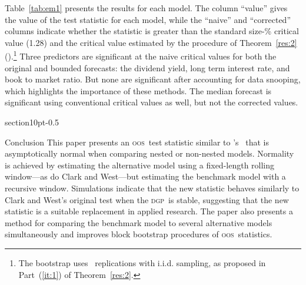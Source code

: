 \documentclass[11pt,fleqn]{article}
\makeatletter
\newcommand\poscw{\citeauthor{ClW:06}'s \citeyearpar{ClW:06,ClW:07}}
\renewcommand\section{\@startsection%
{section}{1}{0pt}{-\baselineskip}{0.5\baselineskip}%
{\normalfont\normalsize\bfseries\large\raggedright}}
\theoremstyle{definition}
\newcommand{\dgp}{\textsc{dgp}}
\newcommand{\oos}{\textsc{oos}}
\makeatother
\begin{document}
Table~\ref{tab:em1} presents the results for each model.  The column
``value'' gives the value of the test statistic for each model, while
the ``naive'' and ``corrected'' columns indicate whether the statistic
is greater than the standard size-\bootsize\% critical value (1.28)
and the critical value estimated by the procedure of
Theorem~\ref{res:2} (\empiricalcriticalvalue).\footnote{The bootstrap
  uses \nboot\ replications with i.i.d. sampling, as proposed in
  Part~(\ref{it:1}) of Theorem~\ref{res:2}.}  Three predictors are
significant at the naive critical values for both the original and
bounded forecasts: the dividend yield, long term interest rate, and
book to market ratio.  But none are significant after accounting for
data snooping, which highlights the importance of these methods.  The
median forecast is significant using conventional critical values as
well, but not the corrected values.

\begin{table}[tb!]
  \centering
  \empiricaltable
\caption{Results from \oos\ comparison of equity premium prediction
  models; the benchmark is the recursive sample mean of the equity
  premium and each alternative model is a constant and single lag of
  the variable listed in the ``predictor'' column.  The dataset begins
  in 1927 and ends in 2009 and is annual data. The ``value'' column
  lists the value of this paper's \oos\ statistic, the ``naive''
  column indicates whether the statistic is significant at standard
  critical values, and the ``corrected'' column indicates significance
  using the critical values proposed in Theorem~\ref{res:2} that
  account for the number of models.  See Section~\ref{sec:3} for details.}
\label{tab:em1}
\end{table}


\section{Conclusion}\label{sec:4}
This paper presents an \oos\ test statistic similar to \poscw\ that is
asymptotically normal when comparing nested or non-nested models.
Normality is achieved by estimating the alternative model using a
fixed-length rolling window---as do Clark and West---but estimating
the benchmark model with a recursive window.  Simulations indicate
that the new statistic behaves similarly to Clark and West's original
test when the \dgp\ is stable, suggesting that the new statistic is
a suitable replacement in applied research.  The paper also presents a
method for comparing the benchmark model to several alternative models
simultaneously and improves block bootstrap procedures of \oos\
statistics.
\end{document}
